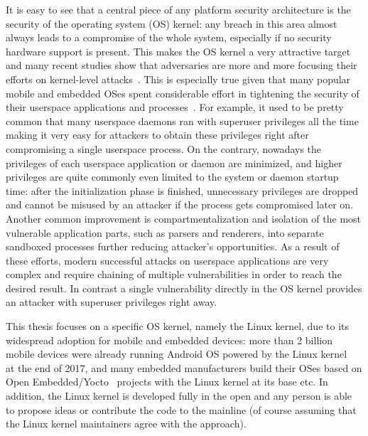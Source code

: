 \begin{quoting}
\end{quoting}

It is easy to see that a central piece of any platform security architecture is the security of the operating system (OS) kernel: any breach in this area almost always leads to a compromise of the whole system, especially if no security hardware support is present. This makes the OS kernel a very attractive target and many recent studies show that adversaries are more and more focusing their efforts on kernel-level attacks~\cite{stoep2016android}. This is especially true given that many popular mobile and embedded OSes spent considerable effort in tightening the security of their userspace applications and processes~\cite{stoep2016android}. For example, it used to be pretty common that many userspace daemons ran with superuser privileges all the time making it very easy for attackers to obtain these privileges right after compromising a single userspace process. On the contrary, nowadays the privileges of each userspace application or daemon are minimized, and higher privileges are quite commonly even limited to the system or daemon startup time: after the initialization phase is finished, unnecessary privileges are dropped and cannot be misused by an attacker if the process gets compromised later on. Another common improvement is compartmentalization and isolation of the most vulnerable application parts, such as parsers and renderers, into separate sandboxed processes further reducing attacker's opportunities. As a result of these efforts, modern successful attacks on userspace applications are very complex and require chaining of multiple vulnerabilities in order to reach the desired result. In contrast a single vulnerability directly in the OS kernel provides an attacker with superuser privileges right away.

This thesis focuses on a specific OS kernel, namely the Linux kernel, due to its widespread adoption for mobile and embedded devices: more than 2 billion mobile devices were already running Android OS powered by the Linux kernel~\cite{googleio2017} at the end of 2017, and many embedded manufacturers build their OSes based on Open Embedded/Yocto~\cite{OE2017, yocto2017} projects with the Linux kernel at its base etc. 
In addition, the Linux kernel is developed fully in the open and any person is able to propose ideas or contribute the code to the mainline (of course assuming that the Linux kernel maintainers agree with the approach).

